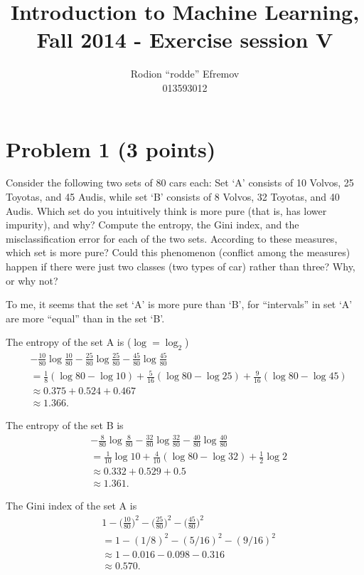 \documentclass[10pt]{article}
\title{Introduction to Machine Learning, Fall 2014 - Exercise session V}
\author{Rodion ``rodde'' Efremov \\ 013593012}
\begin{document}
 \maketitle

\color{blue}
\section*{Problem 1 (3 points)}
Consider the following two sets of 80 cars each: Set `A' consists of 10 Volvos, 25 Toyotas, and 45 Audis, while set `B' consists of 8 Volvos, 32 Toyotas, and 40 Audis. Which set do you intuitively think is more pure (that is, has lower impurity), and why? Compute the entropy, the Gini index, and the misclassification error for each of the two sets. According to these measures, which set is more pure? Could this phenomenon (conflict among the measures) happen if there were just two classes (two types of car) rather than three? Why, or why not?

\color{black}
To me, it seems that the set `A' is more pure than `B', for ``intervals'' in set `A' are more ``equal'' than in the set `B'.

The entropy of the set A is ($\log = \log_2$)
\begin{align*}
&-\frac{10}{80} \log \frac{10}{80} - \frac{25}{80} \log \frac{25}{80} - \frac{45}{80} \log \frac{45}{80} \\ 
&= \frac{1}{8}(\log 80 - \log 10) +\frac{5}{16} (\log 80 - \log 25) + \frac{9}{16} (\log 80 - \log 45) \\
 &\approx 0.375 + 0.524 + 0.467 \\
 &\approx 1.366.
\end{align*}

The entropy of the set B is
\begin{align*}
&-\frac{8}{80} \log \frac{8}{80} - \frac{32}{80} \log \frac{32}{80} - \frac{40}{80} \log \frac{40}{80} \\
&= \frac{1}{10} \log 10 + \frac{4}{10} (\log 80 - \log 32) + \frac{1}{2} \log 2 \\
&\approx 0.332+ 0.529 + 0.5 \\
&\approx 1.361.
\end{align*}

The Gini index of the set A is
\begin{align*}
&1 - \Bigg( \frac{10}{80} \Bigg)^2 - \Bigg( \frac{25}{80} \Bigg)^2 - \Bigg( \frac{45}{80}  \Bigg)^2 \\
&= 1 - (1 / 8)^2 - (5/16)^2 - (9/16)^2 \\
&\approx 1 - 0.016 - 0.098 - 0.316 \\
&\approx 0.570.
\end{align*}
\end{document}
